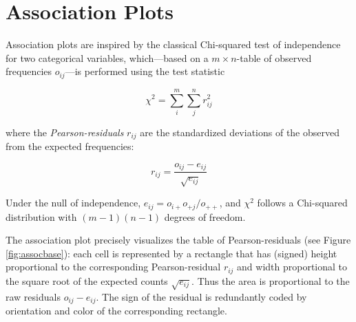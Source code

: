 \documentclass[10pt]{article}
\begin{document}
\section{Association Plots}

Association plots \cite[][]{vcd:Cohen:1980} are inspired by the classical Chi-squared test of
independence for two categorical variables, which---based on a $m
\times n$-table of observed frequencies $o_{ij}$---is performed using the test
statistic

\[\chi^2 = \sum_{i}^{m}\sum_{j}^{n}r_{ij}^2\]

\noindent where the \emph{Pearson-residuals} $r_{ij}$ are the standardized deviations
of the observed from the expected frequencies:

\[r_{ij} = \frac{o_{ij} - e_{ij}}{\sqrt{e_{ij}}}\]

\noindent Under the null of independence, $e_{ij} = o_{i+}o_{+j}/o_{++}$, and $\chi^2$
follows a Chi-squared distribution with $(m-1)(n-1)$ degrees of
freedom.

The association plot precisely visualizes the table of
Pearson-residuals (see Figure \ref{fig:assocbase}):
each cell is represented by a rectangle that has (signed) height
proportional to the corresponding Pearson-residual $r_{ij}$ and width proportional to the
square root of the expected counts $\sqrt{e_{ij}}$. Thus the area is proportional to
the raw residuals $o_{ij} - e_{ij}$. The sign of the residual is redundantly
coded by orientation and color of the corresponding rectangle.
\end{document}

